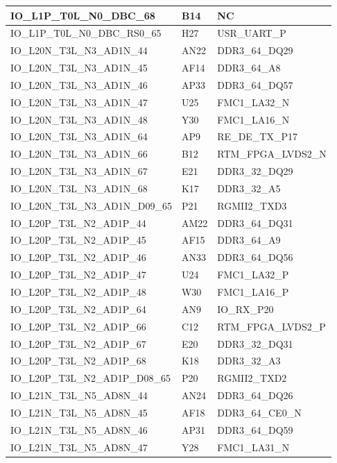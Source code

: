 \begin{footnotesize}
\begin{longtable}{|p{7cm}|p{1cm}|p{5cm}|}
IO\_L1P\_T0L\_N0\_DBC\_68	&	B14	&	NC	\\ \hline
IO\_L1P\_T0L\_N0\_DBC\_RS0\_65	&	H27	&	USR\_UART\_P	\\ \hline
IO\_L20N\_T3L\_N3\_AD1N\_44	&	AN22	&	DDR3\_64\_DQ29	\\ \hline
IO\_L20N\_T3L\_N3\_AD1N\_45	&	AF14	&	DDR3\_64\_A8	\\ \hline
IO\_L20N\_T3L\_N3\_AD1N\_46	&	AP33	&	DDR3\_64\_DQ57	\\ \hline
IO\_L20N\_T3L\_N3\_AD1N\_47	&	U25	&	FMC1\_LA32\_N	\\ \hline
IO\_L20N\_T3L\_N3\_AD1N\_48	&	Y30	&	FMC1\_LA16\_N	\\ \hline
IO\_L20N\_T3L\_N3\_AD1N\_64	&	AP9	&	RE\_DE\_TX\_P17	\\ \hline
IO\_L20N\_T3L\_N3\_AD1N\_66	&	B12	&	RTM\_FPGA\_LVDS2\_N	\\ \hline
IO\_L20N\_T3L\_N3\_AD1N\_67	&	E21	&	DDR3\_32\_DQ29	\\ \hline
IO\_L20N\_T3L\_N3\_AD1N\_68	&	K17	&	DDR3\_32\_A5	\\ \hline
IO\_L20N\_T3L\_N3\_AD1N\_D09\_65	&	P21	&	RGMII2\_TXD3	\\ \hline
IO\_L20P\_T3L\_N2\_AD1P\_44	&	AM22	&	DDR3\_64\_DQ31	\\ \hline
IO\_L20P\_T3L\_N2\_AD1P\_45	&	AF15	&	DDR3\_64\_A9	\\ \hline
IO\_L20P\_T3L\_N2\_AD1P\_46	&	AN33	&	DDR3\_64\_DQ56	\\ \hline
IO\_L20P\_T3L\_N2\_AD1P\_47	&	U24	&	FMC1\_LA32\_P	\\ \hline
IO\_L20P\_T3L\_N2\_AD1P\_48	&	W30	&	FMC1\_LA16\_P	\\ \hline
IO\_L20P\_T3L\_N2\_AD1P\_64	&	AN9	&	IO\_RX\_P20	\\ \hline
IO\_L20P\_T3L\_N2\_AD1P\_66	&	C12	&	RTM\_FPGA\_LVDS2\_P	\\ \hline
IO\_L20P\_T3L\_N2\_AD1P\_67	&	E20	&	DDR3\_32\_DQ31	\\ \hline
IO\_L20P\_T3L\_N2\_AD1P\_68	&	K18	&	DDR3\_32\_A3	\\ \hline
IO\_L20P\_T3L\_N2\_AD1P\_D08\_65	&	P20	&	RGMII2\_TXD2	\\ \hline
IO\_L21N\_T3L\_N5\_AD8N\_44	&	AN24	&	DDR3\_64\_DQ26	\\ \hline
IO\_L21N\_T3L\_N5\_AD8N\_45	&	AF18	&	DDR3\_64\_CE0\_N	\\ \hline
IO\_L21N\_T3L\_N5\_AD8N\_46	&	AP31	&	DDR3\_64\_DQ59	\\ \hline
IO\_L21N\_T3L\_N5\_AD8N\_47	&	Y28	&	FMC1\_LA31\_N	\\ \hline

\end{longtable}
\end{footnotesize}
